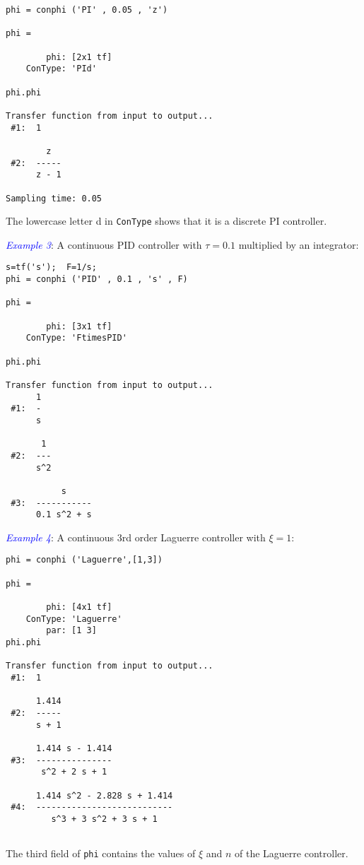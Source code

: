 \documentclass [12pt , a4paper] {article}
\begin{document}
\begin{lstlisting}
phi = conphi ('PI' , 0.05 , 'z') 

phi = 

        phi: [2x1 tf]
    ConType: 'PId'

phi.phi
 
Transfer function from input to output...
 #1:  1
 
        z
 #2:  -----
      z - 1
 
Sampling time: 0.05
\end{lstlisting}
The lowercase letter d in \texttt{ConType} shows that it is a discrete PI controller.

\textcolor{blue}{\emph{Example 3}}: A continuous PID controller with $\tau=0.1$ multiplied by an integrator:

\begin{lstlisting}
s=tf('s');  F=1/s;
phi = conphi ('PID' , 0.1 , 's' , F) 

phi = 

        phi: [3x1 tf]
    ConType: 'FtimesPID'
    
phi.phi
 
Transfer function from input to output...
      1
 #1:  -
      s
 
       1
 #2:  ---
      s^2
 
           s
 #3:  -----------
      0.1 s^2 + s    

\end{lstlisting}

\textcolor{blue}{\emph{Example 4}}: A continuous 3rd order Laguerre controller with $\xi=1$:

\begin{lstlisting}
phi = conphi ('Laguerre',[1,3])

phi = 

        phi: [4x1 tf]
    ConType: 'Laguerre'
        par: [1 3]
phi.phi
 
Transfer function from input to output...
 #1:  1
 
      1.414
 #2:  -----
      s + 1
 
      1.414 s - 1.414
 #3:  ---------------
       s^2 + 2 s + 1
 
      1.414 s^2 - 2.828 s + 1.414
 #4:  ---------------------------
         s^3 + 3 s^2 + 3 s + 1
         
\end{lstlisting}
The third field of \verb"phi" contains the values of $\xi$ and $n$ of the Laguerre controller.
\end{document}
